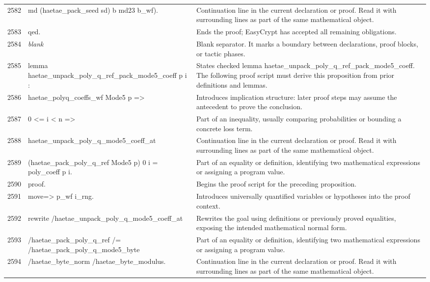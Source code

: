 \documentclass[10pt]{article}
\begin{document}
\begin{longtable}{r L{0.53\textwidth} L{0.37\textwidth}}
2582 & {\ttfamily\scriptsize               md (haetae\_pack\_seed sd) b md23 b\_wf).} & Continuation line in the current declaration or proof.  Read it with surrounding lines as part of the same mathematical object. \\
2583 & {\ttfamily\scriptsize qed.} & Ends the proof; EasyCrypt has accepted all remaining obligations. \\
2584 & {\ttfamily\scriptsize \emph{blank}} & Blank separator.  It marks a boundary between declarations, proof blocks, or tactic phases. \\
2585 & {\ttfamily\scriptsize lemma haetae\_unpack\_poly\_q\_ref\_pack\_mode5\_coeff p i :} & States checked lemma haetae\_unpack\_poly\_q\_ref\_pack\_mode5\_coeff.  The following proof script must derive this proposition from prior definitions and lemmas. \\
2586 & {\ttfamily\scriptsize   haetae\_polyq\_coeffs\_wf Mode5 p =>} & Introduces implication structure: later proof steps may assume the antecedent to prove the conclusion. \\
2587 & {\ttfamily\scriptsize   0 <= i < n =>} & Part of an inequality, usually comparing probabilities or bounding a concrete loss term. \\
2588 & {\ttfamily\scriptsize   haetae\_unpack\_poly\_q\_mode5\_coeff\_at} & Continuation line in the current declaration or proof.  Read it with surrounding lines as part of the same mathematical object. \\
2589 & {\ttfamily\scriptsize     (haetae\_pack\_poly\_q\_ref Mode5 p) 0 i = poly\_coeff p i.} & Part of an equality or definition, identifying two mathematical expressions or assigning a program value. \\
2590 & {\ttfamily\scriptsize proof.} & Begins the proof script for the preceding proposition. \\
2591 & {\ttfamily\scriptsize move=> p\_wf i\_rng.} & Introduces universally quantified variables or hypotheses into the proof context. \\
2592 & {\ttfamily\scriptsize rewrite /haetae\_unpack\_poly\_q\_mode5\_coeff\_at} & Rewrites the goal using definitions or previously proved equalities, exposing the intended mathematical normal form. \\
2593 & {\ttfamily\scriptsize         /haetae\_pack\_poly\_q\_ref /= /haetae\_pack\_poly\_q\_mode5\_byte} & Part of an equality or definition, identifying two mathematical expressions or assigning a program value. \\
2594 & {\ttfamily\scriptsize         /haetae\_byte\_norm /haetae\_byte\_modulus.} & Continuation line in the current declaration or proof.  Read it with surrounding lines as part of the same mathematical object. \\

\end{longtable}
\end{document}
